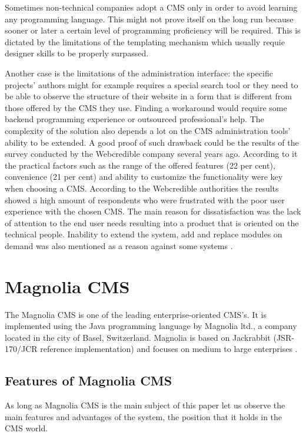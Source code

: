 Sometimes non-technical companies adopt a CMS only in order to avoid learning
any programming language. This might not prove itself on the long run because
sooner or later a certain level of programming proficiency will be required.
This is dictated by the limitations of the templating mechanism which usually
requie designer skills to be properly surpassed.

Another case is the limitations of the administration interface: the specific
projects' authors might for example requires a special search tool or they need
to be able to observe the structure of their website in a form that is different
from those offered by the CMS they use. Finding a workaround would require some
backend programming experience or outsourced professional's help.
The complexity of the solution also depends a lot on the CMS administration
tools' ability to be extended. A good proof of such drawback could be the
results of the survey conducted by the Webcredible company several years ago.
According to it the practical factors such as the range of the offered features
(22 per cent), convenience (21 per cent) and ability to customize the
functionality were key when choosing a CMS. According to the Webcredible
authorities the results showed a high amount of respondents who were frustrated
with the poor user experience with the chosen CMS. The main reason for
dissatisfaction was the lack of attention to the end user needs resulting into a
product that is oriented on the technical people. Inability to extend the
system, add and replace modules on demand was also mentioned as a reason against
some systems \cite{poor_cms_experience}.

\section{Magnolia CMS}
The Magnolia CMS is one of the leading enterprise-oriented CMS's. It is
implemented using the Java programming language by Magnolia ltd., a company
located in the city of Basel, Switzerland. Magnolia is based on Jackrabbit
(JSR-170/JCR reference implementation) and focuses on medium to large
enterprises \cite{magnolia_cms_website}.

\subsection{Features of Magnolia CMS}
As long as Magnolia CMS is the main subject of this paper let us observe the
main features and advantages of the system, the position that it holds in the CMS world.

